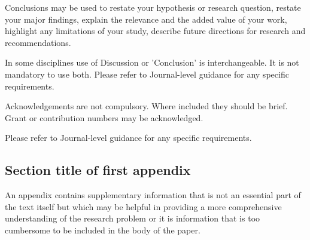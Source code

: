 \documentclass[sn-mathphys-num]{sn-jnl}%
\theoremstyle{thmstyleone}%
\theoremstyle{thmstyletwo}%
\theoremstyle{thmstylethree}%
\begin{document}
Conclusions may be used to restate your hypothesis or research question, restate your major findings, explain the relevance and the added value of your work, highlight any limitations of your study, describe future directions for research and recommendations. 

In some disciplines use of Discussion or 'Conclusion' is interchangeable. It is not mandatory to use both. Please refer to Journal-level guidance for any specific requirements. 

\backmatter


Acknowledgements are not compulsory. Where included they should be brief. Grant or contribution numbers may be acknowledged.

Please refer to Journal-level guidance for any specific requirements.

\begin{appendices}

\section{Section title of first appendix}\label{secA1}

An appendix contains supplementary information that is not an essential part of the text itself but which may be helpful in providing a more comprehensive understanding of the research problem or it is information that is too cumbersome to be included in the body of the paper.




\end{appendices}
\end{document}
